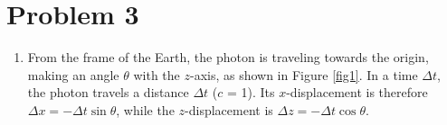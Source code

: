 \documentclass[12pt]{article}
\begin{document}
\section*{Problem 3}
\begin{enumerate}[label=(\alph*)]
    \item From the frame of the Earth, the photon is traveling towards the origin, making an angle $\theta$ with the $z$-axis, as shown in Figure \ref{fig1}. In a time $\Delta t$, the photon travels a distance $\Delta t$ ($c$ = 1). Its $x$-displacement is therefore $\Delta x = -\Delta t \sin\theta$, while the $z$-displacement is $\Delta z = -\Delta t \cos\theta$.
    \begin{figure}
        \centering
\end{figure}
\end{enumerate}
\end{document}
